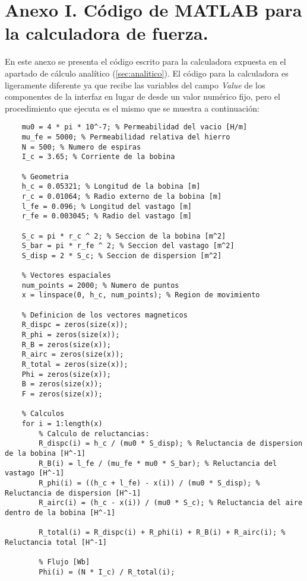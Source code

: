 \section*{Anexo I. Código de MATLAB\textsuperscript{\textregistered} para la calculadora de fuerza.}
\label{sec:anexo1}
En este anexo se presenta el código escrito para la calculadora expuesta en el apartado de cálculo analítico (\ref{sec:analitico}). El código para la calculadora es ligeramente diferente ya que recibe las variables del campo \textit{Value} de los componentes de la interfaz en lugar de desde un valor numérico fijo, pero el procedimiento que ejecuta es el mismo que se muestra a continuación:

\begin{lstlisting}[style=Matlab-editor]
    % Propiedades electromagneticas
    mu0 = 4 * pi * 10^-7; % Permeabilidad del vacio [H/m]
    mu_fe = 5000; % Permeabilidad relativa del hierro
    N = 500; % Numero de espiras
    I_c = 3.65; % Corriente de la bobina

    % Geometria
    h_c = 0.05321; % Longitud de la bobina [m]
    r_c = 0.01064; % Radio externo de la bobina [m]
    l_fe = 0.096; % Longitud del vastago [m]
    r_fe = 0.003045; % Radio del vastago [m]

    S_c = pi * r_c ^ 2; % Seccion de la bobina [m^2]
    S_bar = pi * r_fe ^ 2; % Seccion del vastago [m^2]
    S_disp = 2 * S_c; % Seccion de dispersion [m^2]

    % Vectores espaciales
    num_points = 2000; % Numero de puntos
    x = linspace(0, h_c, num_points); % Region de movimiento

    % Definicion de los vectores magneticos
    R_dispc = zeros(size(x));
    R_phi = zeros(size(x));
    R_B = zeros(size(x));
    R_airc = zeros(size(x));
    R_total = zeros(size(x));
    Phi = zeros(size(x));
    B = zeros(size(x));
    F = zeros(size(x));

    % Calculos
    for i = 1:length(x)
        % Calculo de reluctancias:
        R_dispc(i) = h_c / (mu0 * S_disp); % Reluctancia de dispersion de la bobina [H^-1]
        R_B(i) = l_fe / (mu_fe * mu0 * S_bar); % Reluctancia del vastago [H^-1]
        R_phi(i) = ((h_c + l_fe) - x(i)) / (mu0 * S_disp); % Reluctancia de dispersion [H^-1]
        R_airc(i) = (h_c - x(i)) / (mu0 * S_c); % Reluctancia del aire dentro de la bobina [H^-1]

        R_total(i) = R_dispc(i) + R_phi(i) + R_B(i) + R_airc(i); % Reluctancia total [H^-1]
        
        % Flujo [Wb]
        Phi(i) = (N * I_c) / R_total(i);
        

\end{lstlisting}
